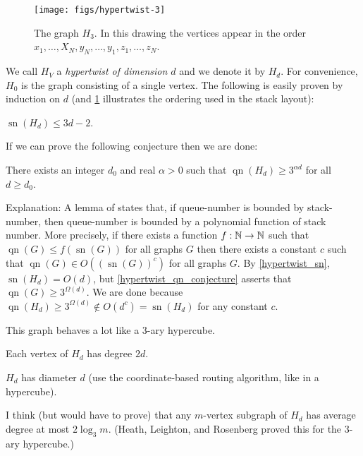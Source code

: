 \documentclass{patmorin}
\DeclareMathOperator{\qn}{qn}
\DeclareMathOperator{\sn}{sn}
\begin{document}
\begin{figure}
    \begin{center}
        \texttt{[image: figs/hypertwist-3]}
    \end{center}
    \caption{The graph $H_3$. In this drawing the vertices appear in the order $x_1,\ldots,X_N,y_N,\ldots,y_1,z_1,\ldots,z_N$.}
    \label{hypertwist}
\end{figure}

We call $H_V$ a \emph{hypertwist of dimension $d$} and we denote it by $H_d$. For convenience, $H_0$ is the graph consisting of a single vertex. The following is easily proven by induction on $d$ (and \cref{hypertwist} illustrates the ordering used in the stack layout):

\begin{lem}\label{hypertwist_sn}
    $\sn(H_d) \le 3d-2$.
\end{lem}

If we can prove the following conjecture then we are done:

\begin{conj}\label{hypertwist_qn_conjecture}
    There exists an integer $d_0$ and real $\alpha >0$ such that $\qn(H_d)\ge 3^{\alpha d}$ for all $d\ge d_0$.
\end{conj}

Explanation:  A lemma of \citet{dujmovic.wood:stacks} states that, if queue-number is bounded by stack-number, then queue-number is bounded by a polynomial function of stack number. More precisely, if there exists a function $f:\mathbb{N}\to\mathbb{N}$ such that $\qn(G)\le f(\sn(G))$ for all graphs $G$ then there exists a constant $c$ such that $\qn(G)\in O((\sn(G))^c)$ for all graphs $G$.  By \cref{hypertwist_sn}, $\sn(H_d)=O(d)$, but \cref{hypertwist_qn_conjecture} asserts that $\qn(G)\ge 3^{\Omega(d)}$.  We are done because $\qn(H_d)\ge 3^{\Omega(d)} \not\in O(d^c)=\sn(H_d)$ for any constant $c$.


This graph behaves a lot like a $3$-ary hypercube.

\begin{compactenum}
    \item Each vertex of $H_d$ has degree $2d$.
    \item $H_d$ has diameter $d$ (use the coordinate-based routing algorithm, like in a hypercube).
    \item I think (but would have to prove) that any $m$-vertex subgraph of $H_d$ has average degree at most $2\log_3 m$.  (Heath, Leighton, and Rosenberg proved this for the $3$-ary hypercube.)
\end{compactenum}
\end{document}
